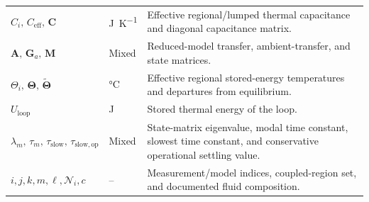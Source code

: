\documentclass[11pt]{article}
\begin{document}
\begin{longtable}{@{}>{\raggedright\arraybackslash}p{1.78in}>{\raggedright\arraybackslash}p{1.08in}>{\raggedright\arraybackslash}p{3.62in}@{}}
$C_i,\,C_{\mathrm{eff}},\,\mathbf C$ & \si{\joule\per\kelvin} & Effective regional/lumped thermal capacitance and diagonal capacitance matrix. \\
$\mathbf A,\,\mathbf G_a,\,\mathbf M$ & Mixed & Reduced-model transfer, ambient-transfer, and state matrices. \\
$\Theta_i,\,\boldsymbol\Theta,\,\widetilde{\boldsymbol\Theta}$ & \si{\degreeCelsius} & Effective regional stored-energy temperatures and departures from equilibrium. \\
$U_{\mathrm{loop}}$ & \si{\joule} & Stored thermal energy of the loop. \\
$\lambda_m,\,\tau_m,\,\tau_{\mathrm{slow}},\,\tau_{\mathrm{slow,op}}$ & Mixed & State-matrix eigenvalue, modal time constant, slowest time constant, and conservative operational settling value. \\
$i,j,k,m,\ell,\mathcal N_i,c$ & -- & Measurement/model indices, coupled-region set, and documented fluid composition. \\
\end{longtable}
\endgroup
\end{document}
